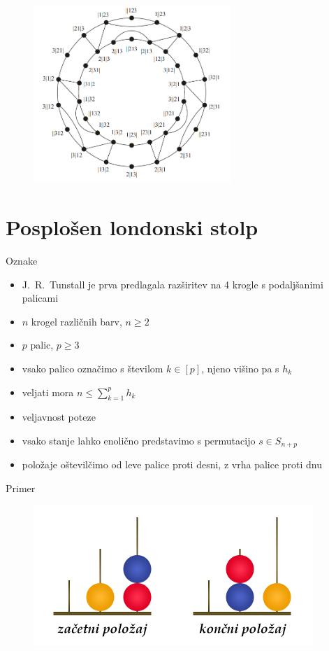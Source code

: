 \documentclass[dvipsnames]{beamer}
\begin{document}
\begin{frame}
    \begin{figure}
        \centering
        \includegraphics[height=190pt]{../img/tolgraph-ham-cycle.png}
    \end{figure}
\end{frame}

\section{Posplošen londonski stolp}
\begin{frame}{Oznake}
    \begin{itemize}
        \item J.\ R.\ Tunstall je prva predlagala razširitev na 4 krogle s podaljšanimi palicami
        \item $n$ krogel različnih barv, $n \geq 2$
        \item $p$ palic, $p \geq 3$
        \item vsako palico označimo s številom $k \in [p]$, njeno višino pa s $h_k$
        \item veljati mora $n \leq \sum_{k=1}^p h_k$
        \item veljavnost poteze
        \item vsako stanje lahko enolično predstavimo s permutacijo $s \in S_{n+p}$
        \item položaje oštevilčimo od leve palice proti desni, z vrha palice proti dnu
    \end{itemize}
\end{frame}

\begin{frame}{Primer}
    \begin{figure}
        \centering
        \includegraphics[height=150pt]{../img/london-tower.png}
    \end{figure}
\end{frame}
\end{document}

